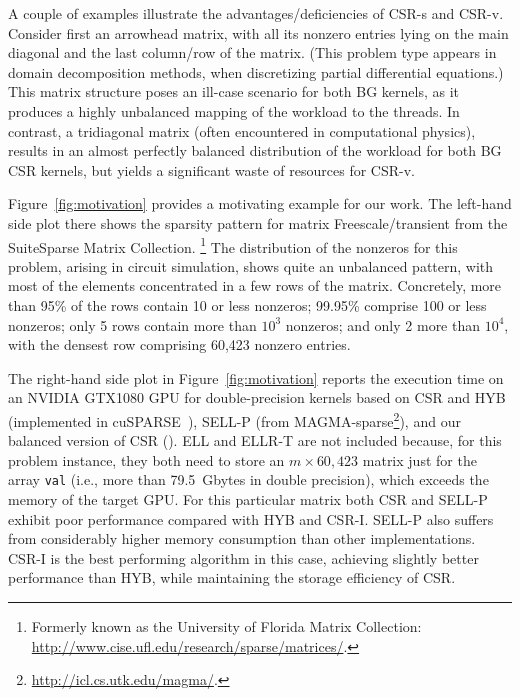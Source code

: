A couple of examples illustrate the advantages/deficiencies
of CSR-s and CSR-v.
Consider first an arrowhead matrix,
with all its nonzero entries lying on the main diagonal
and the last column/row of the matrix.
(This problem type appears in domain decomposition methods,
when discretizing partial differential equations.)
This matrix structure poses an ill-case scenario for both BG kernels,
as it produces a highly unbalanced mapping of the workload to the threads.
In contrast, a tridiagonal matrix
(often encountered in computational physics),
results in an almost perfectly balanced distribution
of the workload for both BG CSR kernels,
but yields a significant waste of resources for CSR-v.

Figure~\ref{fig:motivation} provides a motivating example for our work.
The left-hand side plot there shows the sparsity pattern for matrix
{\sc Freescale/transient} from the SuiteSparse Matrix Collection.%
\footnote{Formerly known as the University of Florida Matrix Collection:
\mbox{\url{http://www.cise.ufl.edu/research/sparse/matrices/}}.}
The distribution of the nonzeros for this problem,
arising in circuit simulation, shows quite an unbalanced pattern,
with most of the elements concentrated in a few rows of the matrix.
Concretely, more than 95\% of the rows contain 10 or less nonzeros;
99.95\% comprise 100 or less nonzeros;
only 5 rows contain more than $10^3$ nonzeros; and only 2 more than $10^4$,
with the densest row comprising
60,423 nonzero entries.

The right-hand side plot in Figure~\ref{fig:motivation}
reports the execution time on an NVIDIA GTX1080 GPU
for double-precision \spmv kernels based on CSR and HYB
(implemented in cuSPARSE~\cite{cusparse}),
SELL-P (from MAGMA-sparse\footnote{
\mbox{\url{http://icl.cs.utk.edu/magma/}}.}),
and our balanced version of CSR (\bcsr).
ELL and ELLR-T are not included because,
for this problem instance, they both need to store an
$m \times 60,423$ matrix just for the array {\tt val}
(i.e., more than 79.5~Gbytes in double precision),
which exceeds the memory of the target GPU.
For this particular matrix both CSR and SELL-P exhibit poor performance
compared with HYB and CSR-I. SELL-P also suffers
from considerably higher memory consumption than other implementations.
CSR-I is the best performing algorithm in this case,
achieving slightly better performance than HYB,
while maintaining the storage efficiency of CSR.

